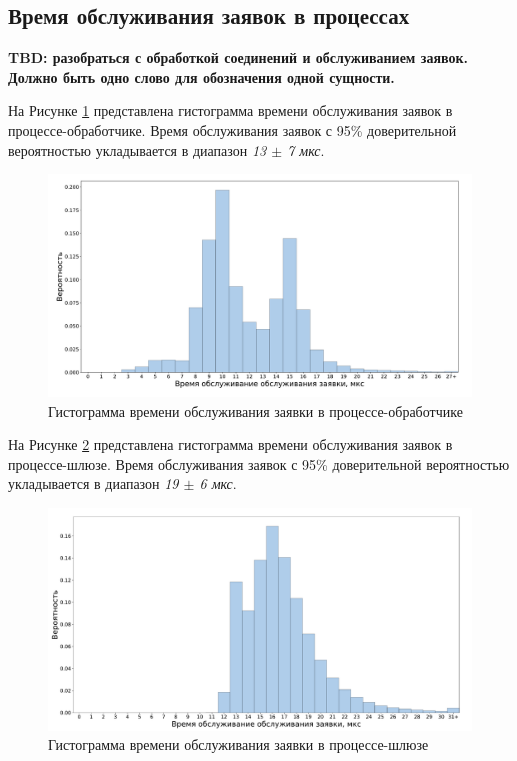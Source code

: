 \subsection{Время обслуживания заявок в процессах}
\textbf{TBD: разобраться с обработкой соединений и обслуживанием заявок. Должно быть одно слово для обозначения одной сущности.}

На Рисунке \ref{chapter41:EngineLatency} представлена гистограмма времени обслуживания заявок в процессе-обработчике. Время обслуживания заявок с 95\% доверительной вероятностью укладывается в диапазон \textit{13 $\pm$ 7 мкс}.
\begin{figure}[!h]
\caption{Гистограмма времени обслуживания заявки в процессе-обработчике}
\label{chapter41:EngineLatency}
\includegraphics[width=\textwidth]{../../graphics/hist/Engine}
\end{figure}

На Рисунке \ref{chapter41:TRLatency} представлена гистограмма времени обслуживания заявок в процессе-шлюзе. Время обслуживания заявок с 95\% доверительной вероятностью укладывается в диапазон \textit{19 $\pm$ 6 мкс}.
\begin{figure}[!h]
\caption{Гистограмма времени обслуживания заявки в процессе-шлюзе}
\label{chapter41:TRLatency}
\includegraphics[width=\textwidth]{../../graphics/hist/TR}
\end{figure}
